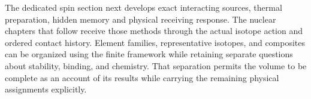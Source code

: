 The dedicated spin section next develops exact interacting sources, thermal preparation, hidden memory and physical receiving response. The nuclear chapters that follow receive those methods through the actual isotope action and ordered contact history. Element families, representative isotopes, and composites can be organized using the finite framework while retaining separate questions about stability, binding, and chemistry. That separation permits the volume to be complete as an account of its results while carrying the remaining physical assignments explicitly.
